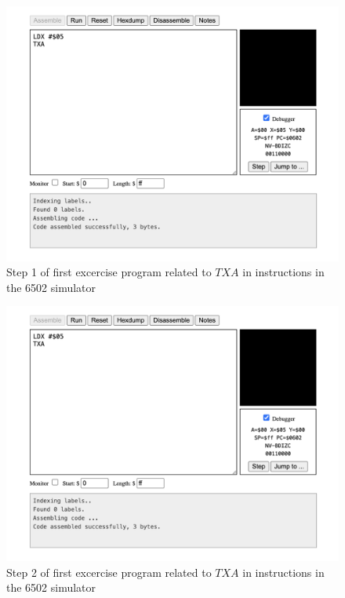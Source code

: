 \documentclass[a4paper]{article}
\begin{document}
\begin{figure}[H]
    \centering
    \includegraphics[width=1.0\textwidth]{res/images/q2/19-ex1-2-step1.png}
    \caption{Step 1 of first excercise program related to $TXA$ in instructions in the 6502 simulator}
    \label{fig:19-ex1-2-step1}
\end{figure}

\begin{figure}[H]
    \centering
    \includegraphics[width=1.0\textwidth]{res/images/q2/19-ex1-2-step1.png}
    \caption{Step 2 of first excercise program related to $TXA$ in instructions in the 6502 simulator}
    \label{fig:20-ex1-2-step2}
\end{figure}
\end{document}
